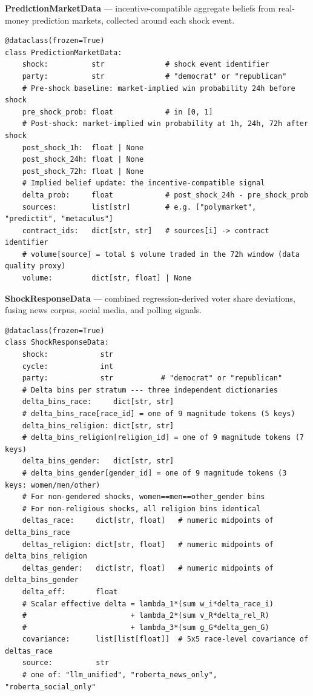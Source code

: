\documentclass[11pt]{article}
\begin{document}
\noindent\textbf{PredictionMarketData} --- incentive-compatible aggregate beliefs
from real-money prediction markets, collected around each shock event.
\begin{lstlisting}
@dataclass(frozen=True)
class PredictionMarketData:
    shock:          str              # shock event identifier
    party:          str              # "democrat" or "republican"
    # Pre-shock baseline: market-implied win probability 24h before shock
    pre_shock_prob: float            # in [0, 1]
    # Post-shock: market-implied win probability at 1h, 24h, 72h after shock
    post_shock_1h:  float | None
    post_shock_24h: float | None
    post_shock_72h: float | None
    # Implied belief update: the incentive-compatible signal
    delta_prob:     float            # post_shock_24h - pre_shock_prob
    sources:        list[str]        # e.g. ["polymarket", "predictit", "metaculus"]
    contract_ids:   dict[str, str]   # sources[i] -> contract identifier
    # volume[source] = total $ volume traded in the 72h window (data quality proxy)
    volume:         dict[str, float] | None
\end{lstlisting}
\noindent\textbf{ShockResponseData} --- combined regression-derived voter share deviations,
fusing news corpus, social media, and polling signals.
\begin{lstlisting}
@dataclass(frozen=True)
class ShockResponseData:
    shock:            str
    cycle:            int
    party:            str           # "democrat" or "republican"
    # Delta bins per stratum --- three independent dictionaries
    delta_bins_race:     dict[str, str]
    # delta_bins_race[race_id] = one of 9 magnitude tokens (5 keys)
    delta_bins_religion: dict[str, str]
    # delta_bins_religion[religion_id] = one of 9 magnitude tokens (7 keys)
    delta_bins_gender:   dict[str, str]
    # delta_bins_gender[gender_id] = one of 9 magnitude tokens (3 keys: women/men/other)
    # For non-gendered shocks, women==men==other_gender bins
    # For non-religious shocks, all religion bins identical
    deltas_race:     dict[str, float]   # numeric midpoints of delta_bins_race
    deltas_religion: dict[str, float]   # numeric midpoints of delta_bins_religion
    deltas_gender:   dict[str, float]   # numeric midpoints of delta_bins_gender
    delta_eff:       float
    # Scalar effective delta = lambda_1*(sum w_i*delta_race_i)
    #                        + lambda_2*(sum v_R*delta_rel_R)
    #                        + lambda_3*(sum g_G*delta_gen_G)
    covariance:      list[list[float]]  # 5x5 race-level covariance of deltas_race
    source:          str
    # one of: "llm_unified", "roberta_news_only", "roberta_social_only"
\end{lstlisting}
\end{document}
